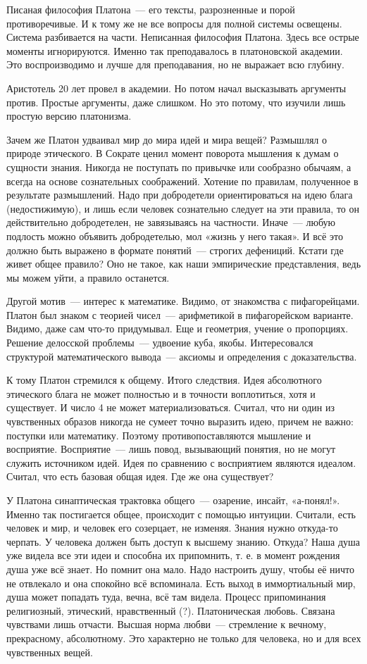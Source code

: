Писаная философия Платона~--- его тексты, разрозненные и порой противоречивые. И к тому же не все вопросы для полной системы освещены. Система разбивается на части. 
Неписанная философия Платона. Здесь все острые моменты игнорируются. Именно так преподавалось в платоновской академии. Это воспроизводимо и лучше для преподавания, но не выражает всю глубину. 

Аристотель 20 лет провел в академии. Но потом начал высказывать аргументы против. Простые аргументы, даже слишком. Но это потому, что изучили лишь простую версию платонизма. 

Зачем же Платон удваивал мир до мира идей и мира вещей?
Размышлял о природе этического. В Сократе ценил момент поворота мышления к думам о сущности знания. Никогда не поступать по привычке или сообразно обычаям, а всегда на основе сознательных соображений. 
Хотение по правилам, полученное в результате размышлений. Надо при добродетели ориентироваться на идею блага (недостижимую), и лишь если человек сознательно следует на эти правила, то он действительно добродетелен, не завязываясь на частности. 
Иначе~--- любую подлость можно объявить добродетелью, мол «жизнь у него такая». 
И всё это должно быть выражено в формате понятий~--- строгих дефениций. Кстати где живет общее правило? Оно не такое, как наши эмпирические представления, ведь мы можем уйти, а правило останется. 

Другой мотив~--- интерес к математике. Видимо, от знакомства с пифагорейцами. 
Платон был знаком с теорией чисел~--- арифметикой в пифагорейском варианте. Видимо, даже сам что-то придумывал. Еще и геометрия, учение о пропорциях. 
Решение делосской проблемы~--- удвоение куба, якобы. Интересовался структурой математического вывода~--- аксиомы и определения с доказательства. 

К тому Платон стремился к общему. Итого следствия. 
Идея абсолютного этического блага не может полностью и в точности воплотиться, хотя и существует. И число 4 не может материализоваться. Считал, что ни один из чувственных образов никогда не сумеет точно выразить идею, причем не важно: поступки или математику. Поэтому противопоставляются мышление и восприятие. 
Восприятие~--- лишь повод, вызывающий понятия, но не могут служить источником идей. Идея по сравнению с восприятием являются идеалом. Считал, что есть базовая общая идея. Где же она существует?

У Платона синаптическая трактовка общего~--- озарение, инсайт, «а-понял!». Именно так постигается общее, происходит с помощью интуиции. Считали, есть человек и мир, и человек его созерцает, не изменяя. 
Знания нужно откуда-то черпать. У человека должен быть доступ к высшему знанию. Откуда? Наша душа уже видела все эти идеи и способна их припомнить, т. е. в момент рождения душа уже всё знает. 
Но помнит она мало. Надо настроить душу, чтобы её ничто не отвлекало и она спокойно всё вспоминала. 
Есть выход в иммортиальный мир, душа может попадать туда, вечна, всё там видела. Процесс припоминания религиозный, этический, нравственный (?). Платоническая любовь. Связана чувствами лишь отчасти. Высшая норма любви~--- стремление к вечному, прекрасному, абсолютному. Это характерно не только для человека, но и для всех чувственных вещей. 
